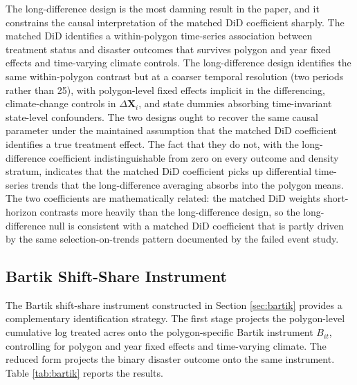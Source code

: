 \documentclass[12pt, letterpaper]{article}
\begin{document}
The long-difference design is the most damning result in the paper, and it constrains the causal interpretation of the matched DiD coefficient sharply. The matched DiD identifies a within-polygon time-series association between treatment status and disaster outcomes that survives polygon and year fixed effects and time-varying climate controls. The long-difference design identifies the same within-polygon contrast but at a coarser temporal resolution (two periods rather than 25), with polygon-level fixed effects implicit in the differencing, climate-change controls in $\Delta \mathbf{X}_i$, and state dummies absorbing time-invariant state-level confounders. The two designs ought to recover the same causal parameter under the maintained assumption that the matched DiD coefficient identifies a true treatment effect. The fact that they do not, with the long-difference coefficient indistinguishable from zero on every outcome and density stratum, indicates that the matched DiD coefficient picks up differential time-series trends that the long-difference averaging absorbs into the polygon means. The two coefficients are mathematically related: the matched DiD weights short-horizon contrasts more heavily than the long-difference design, so the long-difference null is consistent with a matched DiD coefficient that is partly driven by the same selection-on-trends pattern documented by the failed event study.

\subsection{Bartik Shift-Share Instrument}\label{sec:bartik_results}

The Bartik shift-share instrument constructed in Section \ref{sec:bartik} provides a complementary identification strategy. The first stage projects the polygon-level cumulative log treated acres onto the polygon-specific Bartik instrument $B_{it}$, controlling for polygon and year fixed effects and time-varying climate. The reduced form projects the binary disaster outcome onto the same instrument. Table \ref{tab:bartik} reports the results.
\end{document}
